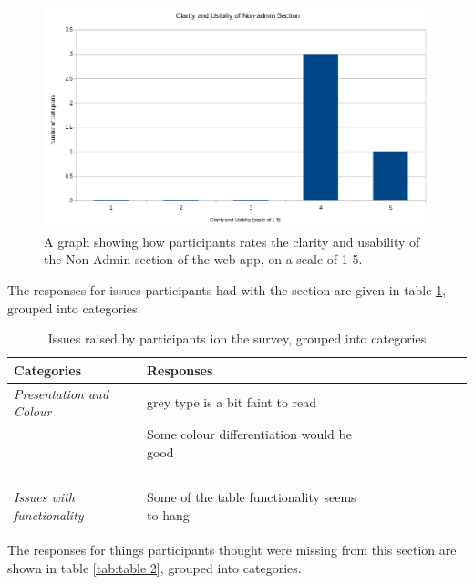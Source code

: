 \documentclass{l4proj}
\begin{document}
\begin{figure}[H]
    \centering
    \includegraphics[width=1\linewidth]{images/Results 1.png} 

    \caption{A graph showing how participants rates the clarity and usability of the Non-Admin section of the web-app, on a scale of 1-5.
    }

    \label{fig:results1}
\end{figure}

The responses for issues participants had with the section are given in table \ref{tab:table 1}, grouped into categories.

\begin{table}[!ht]
    \centering
    \caption{Issues raised by participants ion the survey, grouped into categories}
    \begin{tabular}{|l|l|l|l|l|l|l|l|l|l|}
    \hline
        \textbf{Categories} & \textbf{Responses}  \\ \hline
        \textit{Presentation and Colour} & grey type is a bit faint to read  \\ \hline
        ~ & Some colour differentiation would be good  \\ \hline
        ~ & ~ \\ \hline
        \textit{Issues with functionality} & Some of the table functionality seems to hang  \\ \hline
    \end{tabular}
    \label{tab:table 1}
\end{table}

The responses for things participants thought were missing from this section are shown in table \ref{tab:table 2}, grouped into categories.
\end{document}
